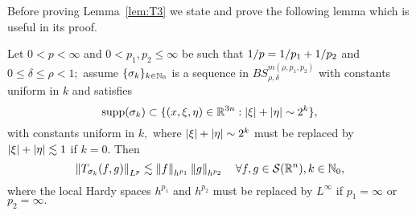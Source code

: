 Before proving Lemma~\ref{lem:T3} we state and prove the following lemma which is useful in its proof.

\begin{lemma}\label{lem:Tsk:bound} Let $0<p<\infty$ and $0<p_1,p_2\le \infty$  be such that $1/p=1/p_1+1/p_2$ and $0\le \delta\le \rho<1;$ assume $\{\sigma_k\}_{k\in \mathbb{N}_0}$ is a sequence in $BS^{m(\rho,p_1,p_2)}_{\rho,\delta}$  with constants uniform in $k$ and satisfies 
\begin{equation*}
{\rm{supp}}(\sigma_k)\subset \{(x,\xi,\eta)\in \mathbb{R}^{3n}: \left\vert \xi \right\vert+\left\vert \eta \right\vert\sim 2^k\},
\end{equation*}
with constants uniform in $k,$  where  $\left\vert \xi \right\vert+\left\vert \eta \right\vert\sim 2^k$ must be replaced by $\left\vert \xi \right\vert+\left\vert \eta \right\vert\lesssim 1$ if $k=0.$
Then 
\begin{equation*}
\left\|T_{\sigma_k}(f,g)\right\|_{L^p}\lesssim \left\|f\right\|_{h^{p_1}}\left\|g\right\|_{h^{p_2}}\quad \forall f,g\in{\mathcal{S}}({{\mathbb R}^n}),k\in\mathbb{N}_0,
\end{equation*}
where the local Hardy spaces $h^{p_1}$ and $h^{p_2}$ must be replaced by $L^\infty$ if $p_1=\infty$ or $p_2=\infty.$
\end{lemma}

